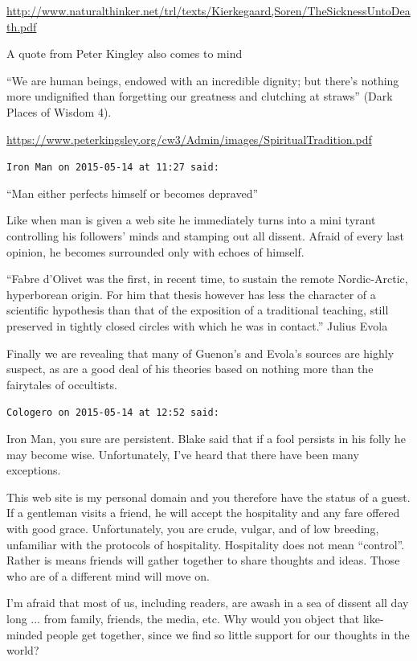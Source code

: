 \begin{footnotesize}
\begin{sffamily}
\url{http://www.naturalthinker.net/trl/texts/Kierkegaard,Soren/TheSicknessUntoDeath.pdf}


A quote from Peter Kingley also comes to mind

``We are human beings, endowed with an incredible dignity; but there's nothing more undignified than forgetting our greatness and clutching at straws'' (Dark Places of Wisdom 4).

\url{https://www.peterkingsley.org/cw3/Admin/images/SpiritualTradition.pdf}


\hfill

\texttt{Iron Man on 2015-05-14 at 11:27 said:}

``Man either perfects himself or becomes depraved''

Like when man is given a web site he immediately turns into a mini tyrant controlling his followers' minds and stamping out all dissent. Afraid of every last opinion, he becomes surrounded only with echoes of himself.

``Fabre d'Olivet was the first, in recent time, to sustain the remote Nordic-Arctic, hyperborean origin. For him that thesis however has less the character of a scientific hypothesis than that of the exposition of a traditional teaching, still preserved in tightly closed circles with which he was in contact.'' Julius Evola

Finally we are revealing that many of Guenon's and Evola's sources are highly suspect, as are a good deal of his theories based on nothing more than the fairytales of occultists.

\hfill

\texttt{Cologero on 2015-05-14 at 12:52 said:}

Iron Man, you sure are persistent. Blake said that if a fool persists in his folly he may become wise. Unfortunately, I've heard that there have been many exceptions.

This web site is my personal domain and you therefore have the status of a guest. If a gentleman visits a friend, he will accept the hospitality and any fare offered with good grace. Unfortunately, you are crude, vulgar, and of low breeding, unfamiliar with the protocols of hospitality. Hospitality does not mean ``control''. Rather is means friends will gather together to share thoughts and ideas. Those who are of a different mind will move on.

I'm afraid that most of us, including readers, are awash in a sea of dissent all day long ... from family, friends, the media, etc. Why would you object that like-minded people get together, since we find so little support for our thoughts in the world?


\end{sffamily}
\end{footnotesize}
